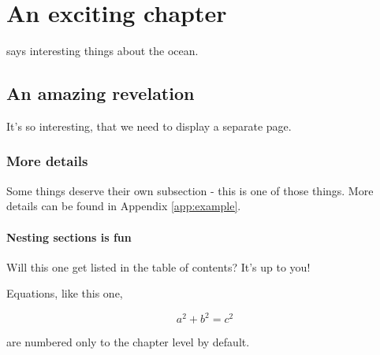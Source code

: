 \chapter{An exciting chapter}
\label{chap:excitement}

\citet{Munk1950} says interesting things about the ocean. 
\newpage
\section{An amazing revelation}
It's so interesting, that we need to display a separate page.

\subsection{More details}
Some things deserve their own subsection - this is one of those things. More details can be found in Appendix \ref{app:example}.

\subsubsection{Nesting sections is fun}
Will this one get listed in the table of contents? It's up to you! 

Equations, like this one,

\begin{equation}
a^{2} + b^{2} = c^{2}
\end{equation}


 are numbered only to the chapter level by default.